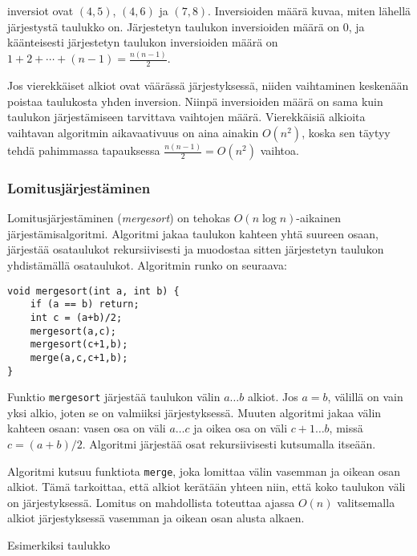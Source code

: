 inversiot ovat $(4,5)$, $(4,6)$ ja $(7,8)$.
Inversioiden määrä kuvaa, miten lähellä
järjestystä taulukko on.
Järjestetyn taulukon inversioiden määrä on 0,
ja käänteisesti järjestetyn taulukon
inversioiden määrä on $1+2+\cdots+(n-1)=\frac{n(n-1)}{2}$.

Jos vierekkäiset alkiot ovat väärässä järjestyksessä,
niiden vaihtaminen keskenään poistaa
taulukosta yhden inversion.
Niinpä inversioiden määrä on sama kuin
taulukon järjestämiseen tarvittava vaihtojen määrä.
Vierekkäisiä alkioita
vaihtavan algoritmin aikavaativuus
on aina ainakin $O(n^2)$,
koska sen täytyy tehdä pahimmassa tapauksessa
$\frac{n(n-1)}{2} = O(n^2)$ vaihtoa.

\subsubsection{Lomitusjärjestäminen}


Lomitusjärjestäminen (\textit{mergesort})
on tehokas $O(n \log n)$-aikainen järjestämisalgoritmi.
Algoritmi jakaa taulukon kahteen yhtä suureen osaan,
järjestää osataulukot rekursiivisesti ja muodostaa
sitten järjestetyn taulukon yhdistämällä osataulukot.
Algoritmin runko on seuraava:
\begin{lstlisting}
void mergesort(int a, int b) {
    if (a == b) return;
    int c = (a+b)/2;
    mergesort(a,c);
    mergesort(c+1,b);
    merge(a,c,c+1,b);
}
\end{lstlisting}
Funktio \texttt{mergesort}
järjestää taulukon välin $a \ldots b$ alkiot.
Jos $a=b$, välillä on vain yksi alkio,
joten se on valmiiksi järjestyksessä.
Muuten algoritmi jakaa välin
kahteen osaan: vasen osa on väli $a \ldots c$
ja oikea osa on väli $c+1 \ldots b$, missä $c=(a+b)/2$.
Algoritmi järjestää osat rekursiivisesti
kutsumalla itseään.

Algoritmi kutsuu funktiota \texttt{merge},
joka lomittaa välin vasemman ja oikean osan alkiot.
Tämä tarkoittaa, että alkiot kerätään yhteen niin,
että koko taulukon väli on järjestyksessä.
Lomitus
on mahdollista toteuttaa ajassa $O(n)$
valitsemalla alkiot järjestyksessä vasemman ja
oikean osan alusta alkaen.

\begin{samepage}
Esimerkiksi taulukko

\begin{center}
\end{center}
\end{samepage}

